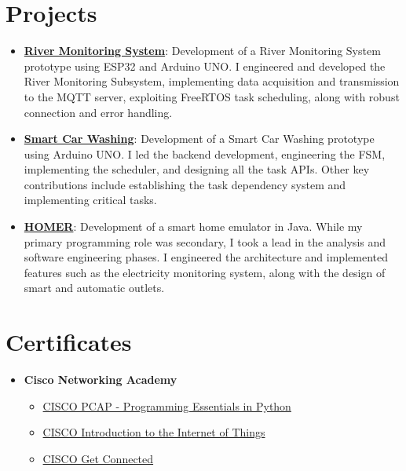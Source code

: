 \documentclass[letterpaper,11pt]{article}
\newcommand{\resumeItem}[2]{
  \item\small{
    \textbf{#1}{: #2 \vspace{-2pt}}
  }
}
\newcommand{\resumeSubItem}[2]{\resumeItem{#1}{#2}\vspace{-4pt}}
\newcommand{\resumeSubHeadingListStart}{\begin{itemize}[leftmargin=*]}
\newcommand{\resumeSubHeadingListEnd}{\end{itemize}}
\begin{document}
\section{Projects}
  \resumeSubHeadingListStart
    \resumeSubItem{\href{https://github.com/aleemont1/esiot-23-24-assignment3/}{River Monitoring System}}
      {Development of a River Monitoring System prototype using ESP32 and Arduino UNO.
       I engineered and developed the River Monitoring Subsystem, implementing data acquisition and
       transmission to the MQTT server, exploiting FreeRTOS task scheduling, along with robust connection and error handling.}
    \resumeSubItem{\href{https://github.com/aleemont1/esiot-23-24-assignment2/}{Smart Car Washing}}
      {Development of a Smart Car Washing prototype using Arduino UNO. 
      I led the backend development, engineering the FSM, implementing the scheduler, and designing all the task APIs. 
      Other key contributions include establishing the task dependency system and implementing critical tasks.}
    \resumeSubItem{\href{https://github.com/progetto-oop-22-23/OOP22-HOMER}{HOMER}}
      {Development of a smart home emulator in Java. 
        While my primary programming role was secondary, I took a lead in the analysis and software engineering phases. 
        I engineered the architecture and implemented features such as the electricity monitoring system, 
        along with the design of smart and automatic outlets.}
  \resumeSubHeadingListEnd

\section{Certificates}
\resumeSubHeadingListStart
    \item{
        \textbf{Cisco Networking Academy}
        {
            \resumeSubHeadingListStart
                \item{\href{https://github.com/aleemont1/curriculum-vitae/blob/main/certificates/PYTHON-2020_certificate.pdf}{CISCO PCAP - Programming Essentials in Python}}
                \item{\href{https://github.com/aleemont1/curriculum-vitae/blob/main/certificates/IOT-2018_certificate.pdf}{CISCO Introduction to the Internet of Things}}
                \item{\href{https://github.com/aleemont1/curriculum-vitae/blob/main/certificates/GetConnected-2017_certificate.pdf}{CISCO Get Connected}}
            \resumeSubHeadingListEnd
        }
    }
    \begin{comment}
    \item{
        \textbf{English}
        {
            \resumeSubHeadingListStart
                \item{\href{https://github.com/aleemont1/curriculum-vitae/blob/main/certificates/English_C1.pdf}{C1 Level Certificate}}
            \resumeSubHeadingListEnd
        }
    }
    \end{comment}
\resumeSubHeadingListEnd
\end{document}
